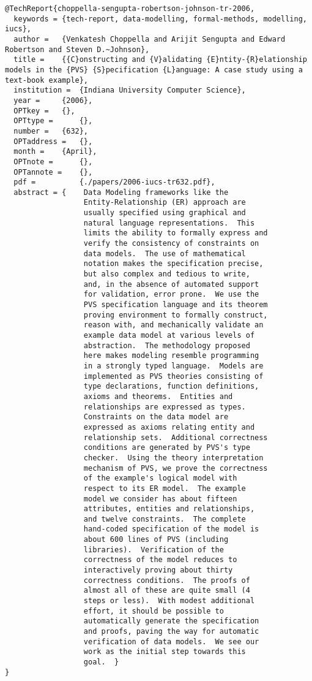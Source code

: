\documentclass[11pt]{article}
\begin{document}
\begin{lstlisting}
@TechReport{choppella-sengupta-robertson-johnson-tr-2006,
  keywords = {tech-report, data-modelling, formal-methods, modelling, iucs},
  author = 	 {Venkatesh Choppella and Arijit Sengupta and Edward Robertson and Steven D.~Johnson},
  title = 	 {{C}onstructing and {V}alidating {E}ntity-{R}elationship models in the {PVS} {S}pecification {L}anguage: A case study using a text-book example},
  institution =  {Indiana University Computer Science},
  year = 	 {2006},
  OPTkey = 	 {},
  OPTtype = 	 {},
  number = 	 {632},
  OPTaddress = 	 {},
  month = 	 {April},
  OPTnote = 	 {},
  OPTannote = 	 {},
  pdf =          {./papers/2006-iucs-tr632.pdf},
  abstract = {    Data Modeling frameworks like the
                  Entity-Relationship (ER) approach are
                  usually specified using graphical and
                  natural language representations.  This
                  limits the ability to formally express and
                  verify the consistency of constraints on
                  data models.  The use of mathematical
                  notation makes the specification precise,
                  but also complex and tedious to write,
                  and, in the absence of automated support
                  for validation, error prone.  We use the
                  PVS specification language and its theorem
                  proving environment to formally construct,
                  reason with, and mechanically validate an
                  example data model at various levels of
                  abstraction.  The methodology proposed
                  here makes modeling resemble programming
                  in a strongly typed language.  Models are
                  implemented as PVS theories consisting of
                  type declarations, function definitions,
                  axioms and theorems.  Entities and
                  relationships are expressed as types.
                  Constraints on the data model are
                  expressed as axioms relating entity and
                  relationship sets.  Additional correctness
                  conditions are generated by PVS's type
                  checker.  Using the theory interpretation
                  mechanism of PVS, we prove the correctness
                  of the example's logical model with
                  respect to its ER model.  The example
                  model we consider has about fifteen
                  attributes, entities and relationships,
                  and twelve constraints.  The complete
                  hand-coded specification of the model is
                  about 600 lines of PVS (including
                  libraries).  Verification of the
                  correctness of the model reduces to
                  interactively proving about thirty
                  correctness conditions.  The proofs of
                  almost all of these are quite small (4
                  steps or less).  With modest additional
                  effort, it should be possible to
                  automatically generate the specification
                  and proofs, paving the way for automatic
                  verification of data models.  We see our
                  work as the initial step towards this
                  goal.  }
}


\end{lstlisting}
\end{document}
